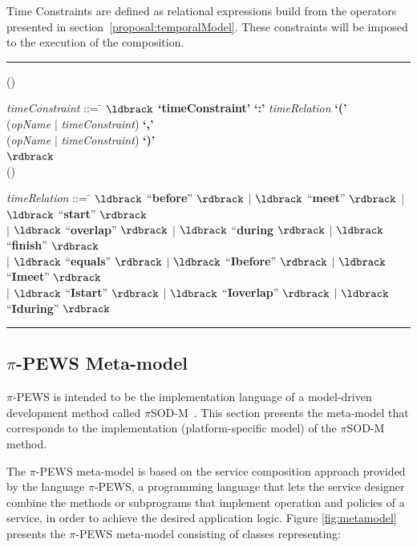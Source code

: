 \documentclass{sig-alternate}
\newcounter{regraB}
\newcommand{\reg}{(\theregraB) \addtocounter{regraB}{1}}
\begin{document}
Time Constraints are defined as relational expressions build from the operators presented in section~\ref{proposal:temporalModel}. 
These constraints will be imposed to the execution of the composition.\\


\hrule
\begin{tabbing}
  
  \reg \textit{timeConstraint} ::= \= $\ldbrack$
  \textbf{`timeConstraint'} \textbf{`:'} \textit{timeRelation} \textbf{`('} \\ \>
  (\textit{opName} $|$ \textit{timeConstraint}) \textbf{`,'} \\ \> (\textit{opName} $|$ \textit{timeConstraint}) \textbf{`)'} \\ 
   \> $\rdbrack$ 
  \\[1.5mm] 
  
   \reg \textit{timeRelation} ::= \= $\ldbrack$  ``\textbf{before}'' $\rdbrack$ 
   $|$ $\ldbrack$  ``\textbf{meet}'' $\rdbrack$ $|$
   $\ldbrack$  ``\textbf{start}'' $\rdbrack$ \\  \> $|$
   $\ldbrack$  ``\textbf{overlap}'' $\rdbrack$ $|$ 
   $\ldbrack$  ``\textbf{during} $\rdbrack$ $|$ $\ldbrack$  ``\textbf{finish}''
   $\rdbrack$ \\  \>  $|$ $\ldbrack$  ``\textbf{equals}'' $\rdbrack$ $|$ 
   $\ldbrack$ ``\textbf{Ibefore}'' $\rdbrack$ $|$  $\ldbrack$ ``\textbf{Imeet}'' $\rdbrack$ 
   \\  \>  $|$ $\ldbrack$ 
   ``\textbf{Istart}'' $\rdbrack$ $|$ $\ldbrack$ 
   ``\textbf{Ioverlap}'' $\rdbrack$  $|$ $\ldbrack$ 
   ``\textbf{Iduring}'' $\rdbrack$ \\[-3mm]
\end{tabbing}
\hrule
\vspace*{2mm}
\bigskip 


\subsection{$\pi$-PEWS Meta-model}

$\pi$-PEWS is intended to be the implementation language of a
model-driven development method called $\pi$SOD-M~\cite{submited}. This
section presents the meta-model that corresponds to the implementation (platform-specific model)
of the $\pi$SOD-M method.

The $\pi$-PEWS meta-model is based on the service composition
approach provided by the language $\pi$-PEWS, a programming language that lets
the service designer combine the methods or subprograms that implement
operation and policies of a service, in order to achieve the desired application
logic. Figure \ref{fig:metamodel} presents the $\pi$-PEWS meta-model consisting
of  classes representing:   
\end{document}
